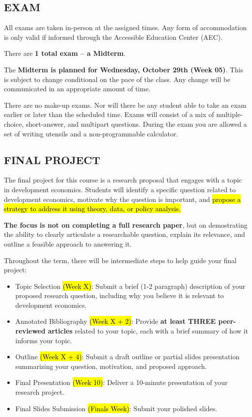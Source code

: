 \documentclass[11pt]{article}
\begin{document}
\subsection*{EXAM}
All exams are taken in-person at the assigned times. 
Any form of accommodation is only valid if informed through the Accessible Education Center (AEC).

There are \textbf{1 total exam -- a Midterm}. 

The \textbf{Midterm is planned for Wednesday, October 29th (Week 05)}. 
This is subject to change conditional on the pace of the class.
Any change will be communicated in an appropriate amount of time. 

There are no make-up exams. 
Nor will there be any student able to take an exam earlier or later than the scheduled time. 
Exams will consist of a mix of multiple-choice, short-answer, and multipart questions. 
During the exam you are allowed a set of writing utensils and a non-programmable calculator. 

\subsection*{FINAL PROJECT}
The final project for this course is a research proposal that engages with a topic in development economics. 
Students will identify a specific question related to development economics, motivate why the question is important, and \hl{propose a strategy to address it using theory, data, or policy analysis.}

\textbf{The focus is not on completing a full research paper}, but on demostrating the ability to clearly articulate a researchable question, explain its relevance, and outline a feasible approach to answering it.

Throughout the term, there will be intermediate steps to help guide your final project:

\begin{itemize}
    \item Topic Selection \hl{(Week X)}: Submit a brief (1-2 paragraph) description of your proposed research question, including why you believe it is relevant to development economics.
    \item Annotated Bibliography \hl{(Week X + 2)}: Provide \textbf{at least THREE peer-reviewed articles} related to your topic, each with a brief summary of how it informs your topic. 
    \item Outline \hl{(Week X + 4)}: Submit a draft outline or partial slides presentation summarizing your question, motivation, and proposed approach. 
    \item Final Presentation \hl{(Week 10)}: Deliver a 10-minute presentation of your research project. 
    \item Final Slides Submission \hl{(Finals Week)}: Submit your polished slides.
\end{itemize}
\end{document}
